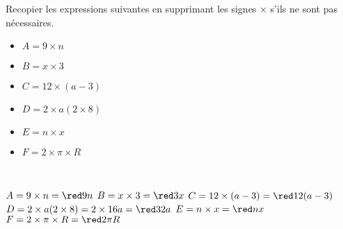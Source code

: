 \begin{exercice*}
    Recopier les expressions suivantes en supprimant les signes $\times$ s'ils ne sont pas nécessaires.
    \begin{multicols}{2}
        \begin{itemize}
        \item[] $A =9\times n$
        \item[] $B =x\times3$
        \item[] $C =12\times(a-3)$
        \item[] $D =2\times a(2\times8)$
        \item[] $E =n\times x$
        \item[] $F =2\times\pi\times R$
        \end{itemize}
    \end{multicols}
\end{exercice*}
    
\begin{corrige}
    \ \\ [-5mm]
    \begin{itemize}
        \def\item{}
        \item $A =9\times n =\red9n$
        \item $B =x\times3 =\red3x$
        \item $C =12\times(a-3) =\red12(a-3)$
        \item $D =2\times a(2\times8) =2\times16a =\red32a$
        \item $E =n\times x =\red nx$
        \item $F =2\times\pi\times R =\red2\pi R$
    \end{itemize}
\end{corrige}